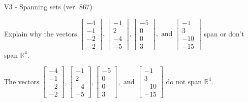 \begin{exercise}
  \begin{exerciseTitle}V3 - Spanning sets (ver. 867)\end{exerciseTitle}
  \begin{exerciseStatement}
    Explain why the vectors \(\left[\begin{array}{r}
-4 \\
-1 \\
-2 \\
-2
\end{array}\right] , \left[\begin{array}{r}
-1 \\
2 \\
-4 \\
-5
\end{array}\right] , \left[\begin{array}{r}
-5 \\
0 \\
0 \\
3
\end{array}\right] , \text{ and } \left[\begin{array}{r}
-1 \\
3 \\
-10 \\
-15
\end{array}\right]\) span or don't span \(\mathbb{R}^4\). 
	


  \end{exerciseStatement}
  \begin{exerciseAnswer}
   The vectors \(\left[\begin{array}{r}
-4 \\
-1 \\
-2 \\
-2
\end{array}\right] , \left[\begin{array}{r}
-1 \\
2 \\
-4 \\
-5
\end{array}\right] , \left[\begin{array}{r}
-5 \\
0 \\
0 \\
3
\end{array}\right] , \text{ and } \left[\begin{array}{r}
-1 \\
3 \\
-10 \\
-15
\end{array}\right]\) 
  	 do not  
	span \(\mathbb{R}^4\).
  


  \end{exerciseAnswer}
\end{exercise}